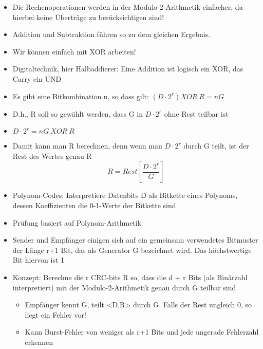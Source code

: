 \begin{itemize}
    \item Die Rechenoperationen werden in der Modulo-2-Arithmetik einfacher, da hierbei keine Überträge zu berücksichtigen sind!
    \item Addition und Subtraktion führen so zu dem gleichen Ergebnis.
    \item Wir können einfach mit XOR arbeiten!
    \item Digitaltechnik, hier Halbaddierer: Eine Addition ist logisch ein XOR, das Carry ein UND
    \item Es gibt eine Bitkombination n, so dass gilt: $(D \cdot 2^r) XOR \ R = n G$
    \item D.h., R soll so gewählt werden, dass G in $D \cdot 2^r$ ohne Rest teilbar ist
    \item $D \cdot 2^r = nG \ XOR \ R$
    \item Damit kann man R berechnen, denn wenn man $D \cdot 2^r$ durch G teilt, ist der Rest des Wertes genau R
    \[R = Rest\left[\frac{D \cdot 2^r}{G}\right]\]
\end{itemize}

\begin{itemize}
    \item Polynom-Codes: Interpretiere Datenbits D als Bitkette eines Polynoms, dessen Koeffizienten die 0-1-Werte der Bitkette sind
    \item Prüfung basiert auf Polynom-Arithmetik
    \item Sender und Empfänger einigen sich auf ein gemeinsam verwendetes Bitmuster der Länge r+1 Bit, das als Generator G bezeichnet wird. Das höchstwertige Bit hiervon ist 1
    \item Konzept: Berechne die r CRC-bits R so, dass die d + r Bits (als Binärzahl interpretiert) mit der Modulo-2-Arithmetik genau durch G teilbar sind
    \begin{itemize}
        \item Empfänger kennt G, teilt <D,R> durch G. Falls der Rest ungleich 0, so liegt ein Fehler vor!
        \item Kann Burst-Fehler von weniger als r+1 Bits und jede ungerade Fehlerzahl erkennen
    \end{itemize}
\end{itemize}
